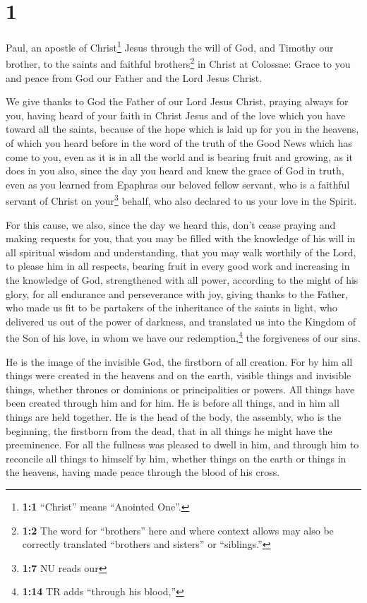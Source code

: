 \hypertarget{section}{%
\section{1}\label{section}}

 Paul, an apostle of Christ\footnote{\textbf{1:1}
  ``Christ'' means ``Anointed One''.} Jesus through the will of God, and
Timothy our brother,  to the saints and faithful
brothers\footnote{\textbf{1:2} The word for ``brothers'' here and where
  context allows may also be correctly translated ``brothers and
  sisters'' or ``siblings.''} in Christ at Colossae: Grace to you and
peace from God our Father and the Lord Jesus Christ.

 We give thanks to God the Father of our Lord Jesus
Christ, praying always for you,  having heard of your
faith in Christ Jesus and of the love which you have toward all the
saints,  because of the hope which is laid up for you in
the heavens, of which you heard before in the word of the truth of the
Good News  which has come to you, even as it is in all the
world and is bearing fruit and growing, as it does in you also, since
the day you heard and knew the grace of God in truth, 
even as you learned from Epaphras our beloved fellow servant, who is a
faithful servant of Christ on your\footnote{\textbf{1:7} NU reads our}
behalf,  who also declared to us your love in the Spirit.

 For this cause, we also, since the day we heard this,
don't cease praying and making requests for you, that you may be filled
with the knowledge of his will in all spiritual wisdom and
understanding,  that you may walk worthily of the Lord,
to please him in all respects, bearing fruit in every good work and
increasing in the knowledge of God,  strengthened with
all power, according to the might of his glory, for all endurance and
perseverance with joy,  giving thanks to the Father, who
made us fit to be partakers of the inheritance of the saints in light,
 who delivered us out of the power of darkness, and
translated us into the Kingdom of the Son of his love, 
in whom we have our redemption,\footnote{\textbf{1:14} TR adds ``through
  his blood,''} the forgiveness of our sins.

 He is the image of the invisible God, the firstborn of
all creation.  For by him all things were created in the
heavens and on the earth, visible things and invisible things, whether
thrones or dominions or principalities or powers. All things have been
created through him and for him.  He is before all
things, and in him all things are held together.  He is
the head of the body, the assembly, who is the beginning, the firstborn
from the dead, that in all things he might have the preeminence.
 For all the fullness was pleased to dwell in him,
 and through him to reconcile all things to himself by
him, whether things on the earth or things in the heavens, having made
peace through the blood of his cross.

